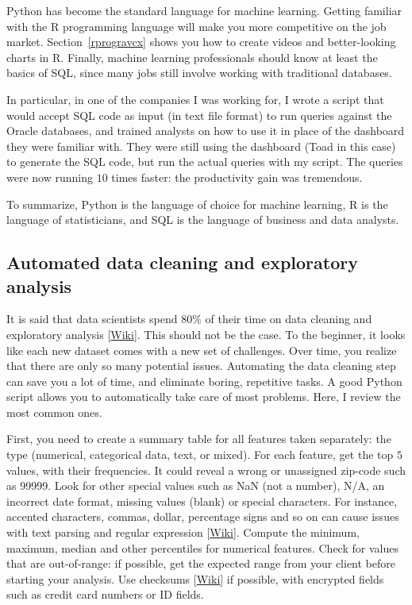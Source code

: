 \documentclass[oneside,10pt]{book}
\begin{document}
Python has become the standard language for machine learning. Getting familiar with the R programming language will make you more competitive on the job market. 
 Section~\ref{rprogravcx} shows you how to create videos and better-looking charts in R. Finally, machine learning professionals should know at least the basics of SQL, since many jobs still involve working with traditional databases. 

In particular, in one of the companies I was working for, I wrote a script that would accept SQL code as input (in text file format) to run queries against the Oracle databases, and trained analysts on how to use it in place of the dashboard they were familiar with. They were still using the dashboard (Toad in this case) to generate the SQL code, but run the actual queries with my script. The queries were now running $10$ times faster: the productivity gain was tremendous.  

To summarize, Python is the language of choice for machine learning, R is the language of statisticians, and SQL is the language of business and data analysts.

\subsection{Automated data cleaning and exploratory analysis}

It is said that data scientists spend $80\%$ of their time on data cleaning and \textcolor{index}{exploratory analysis} [\href{https://en.wikipedia.org/wiki/Exploratory_data_analysis}{Wiki}]. This should not be the case. To the beginner, it looks like each new dataset comes with a new set of challenges.
 Over time, you realize that there are only so many potential issues. Automating the data cleaning step can save you a lot of time, and eliminate boring, repetitive tasks. A good Python script allows you to automatically take care of most problems. Here, I review the most common ones. 

First, you need to create a summary table for all features taken separately: the type (numerical, categorical data, text, or mixed). For each feature, get the top $5$ values, with their frequencies. It could reveal a wrong or unassigned zip-code such as 99999. Look for other special values such as NaN (not a number), N/A, an incorrect date format, missing values (blank) or special characters. For instance,  accented characters, commas, dollar, percentage signs and so on can cause issues with text parsing  and \textcolor{index}{regular expression} [\href{https://en.wikipedia.org/wiki/Regular_expression}{Wiki}]. Compute the minimum, maximum, median and other percentiles for numerical features. Check for values that are out-of-range: if possible, get the expected range from your client before starting your analysis. Use 
\textcolor{index}{checksums} [\href{https://en.wikipedia.org/wiki/Checksum}{Wiki}] 
if possible, with encrypted fields such as credit card numbers or ID fields. 
\end{document}
